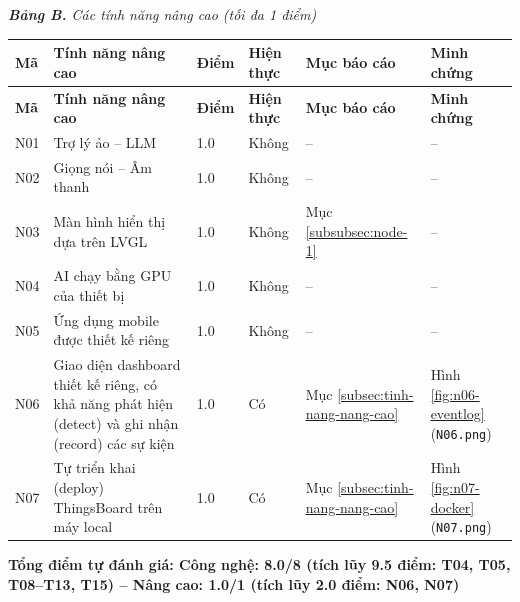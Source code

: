 \vspace{0.3cm}
\begin{center}
  \textit{\textbf{Bảng B.} Các tính năng nâng cao (tối đa 1 điểm)}
\end{center}

{\small
\setlength{\tabcolsep}{4pt}
\renewcommand{\arraystretch}{1.25}
\begin{longtable}{|C{0.06\textwidth}|L{0.37\textwidth}|C{0.07\textwidth}|C{0.12\textwidth}|C{0.11\textwidth}|L{0.15\textwidth}|}
  \hline
  \textbf{Mã} & \textbf{Tính năng nâng cao} & \textbf{Điểm} & \textbf{Hiện thực} & \textbf{Mục báo cáo} & \textbf{Minh chứng} \\
  \hline
  \endfirsthead
  \hline
  \textbf{Mã} & \textbf{Tính năng nâng cao} & \textbf{Điểm} & \textbf{Hiện thực} & \textbf{Mục báo cáo} & \textbf{Minh chứng} \\
  \hline
  \endhead
  \hline
  \endfoot

  N01 & Trợ lý ảo -- LLM & 1.0 & Không & -- & -- \\
  \hline
  N02 & Giọng nói -- Âm thanh & 1.0 & Không & -- & -- \\
  \hline
  N03 & Màn hình hiển thị dựa trên LVGL & 1.0 & Không & Mục \ref{subsubsec:node-1} & -- \\
  \hline
  N04 & AI chạy bằng GPU của thiết bị & 1.0 & Không & -- & -- \\
  \hline
  N05 & Ứng dụng mobile được thiết kế riêng & 1.0 & Không & -- & -- \\
  \hline
  N06 & Giao diện dashboard thiết kế riêng, có khả năng phát hiện (detect) và ghi nhận (record) các sự kiện & 1.0 & Có & Mục \ref{subsec:tinh-nang-nang-cao} & Hình \ref{fig:n06-eventlog} (\texttt{N06.png}) \\
  \hline
  N07 & Tự triển khai (deploy) ThingsBoard trên máy local & 1.0 & Có & Mục \ref{subsec:tinh-nang-nang-cao} & Hình \ref{fig:n07-docker} (\texttt{N07.png}) \\
  \hline
\end{longtable}
}

\noindent\textbf{\textcolor{iotPrimary}{Tổng điểm tự đánh giá: Công nghệ: 8.0/8 (tích lũy 9.5 điểm: T04, T05, T08--T13, T15) \quad -- \quad Nâng cao: 1.0/1 (tích lũy 2.0 điểm: N06, N07)}}
